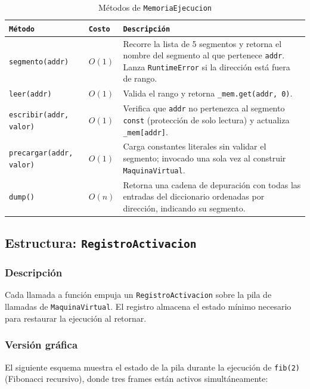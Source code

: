 \documentclass[12pt, letterpaper]{article}
\theoremstyle{definition}
\begin{document}
\begin{table}[H]
\centering
\caption{Métodos de \texttt{MemoriaEjecucion}}
\label{tab:metodos-mem}
\begin{tabular}{|p{3.8cm}|p{1.5cm}|p{7.7cm}|}
    \hline
    \texttt{Método} & \texttt{Costo} & \texttt{Descripción} \\ \hline
    \texttt{segmento(addr)} & $O(1)$ &
    Recorre la lista de 5 segmentos y retorna el nombre del segmento al que pertenece \texttt{addr}. Lanza \texttt{RuntimeError} si la dirección está fuera de rango. \\ \hline
    \texttt{leer(addr)} & $O(1)$ &
    Valida el rango y retorna \texttt{\_mem.get(addr, 0)}.  \\ \hline
    \texttt{escribir(addr, valor)} & $O(1)$ &
    Verifica que \texttt{addr} no pertenezca al segmento \texttt{const} (protección de solo lectura) y actualiza \texttt{\_mem[addr]}. \\ \hline
    \texttt{precargar(addr, valor)} & $O(1)$ &
    Carga constantes literales sin validar el segmento; invocado una sola vez al construir \texttt{MaquinaVirtual}. \\ \hline
    \texttt{dump()} & $O(n)$ &
    Retorna una cadena de depuración con todas las entradas del diccionario ordenadas por dirección, indicando su segmento. \\ \hline
\end{tabular}
\end{table}

\subsection{Estructura: \texttt{RegistroActivacion}}

\subsubsection*{Descripción}

Cada llamada a función empuja un \texttt{RegistroActivacion} sobre la pila de llamadas de \texttt{MaquinaVirtual}. El registro almacena el estado mínimo necesario para restaurar la ejecución al retornar.

\subsubsection*{Versión gráfica}

El siguiente esquema muestra el estado de la pila durante la ejecución de \texttt{fib(2)} (Fibonacci recursivo), donde tres frames están activos simultáneamente:
\end{document}
